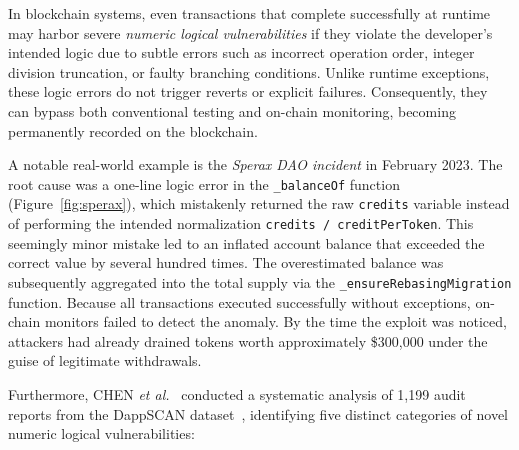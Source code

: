 \documentclass[pdflatex,sn-basic]{sn-jnl}%
\theoremstyle{thmstyleone}%
\theoremstyle{thmstyletwo}%
\theoremstyle{thmstylethree}%
\begin{document}
In blockchain systems, even transactions that complete successfully at runtime may harbor severe \textit{numeric logical vulnerabilities} if they violate the developer’s intended logic due to subtle errors such as incorrect operation order, integer division truncation, or faulty branching conditions. Unlike runtime exceptions, these logic errors do not trigger reverts or explicit failures. Consequently, they can bypass both conventional testing and on-chain monitoring, becoming permanently recorded on the blockchain.

A notable real-world example is the \textit{Sperax DAO incident} in February 2023. The root cause was a one-line logic error in the \texttt{\_balanceOf} function (Figure~\ref{fig:sperax}), which mistakenly returned the raw \texttt{credits} variable instead of performing the intended normalization \texttt{credits / creditPerToken}. This seemingly minor mistake led to an inflated account balance that exceeded the correct value by several hundred times. The overestimated balance was subsequently aggregated into the total supply via the \texttt{\_ensureRebasingMigration} function. Because all transactions executed successfully without exceptions, on-chain monitors failed to detect the anomaly. By the time the exploit was noticed, attackers had already drained tokens worth approximately \$300,000 under the guise of legitimate withdrawals.

Furthermore, CHEN \textit{et al.}~\citep{numscout} conducted a systematic analysis of 1,199 audit reports from the DappSCAN dataset~\citep{dappscan}, identifying five distinct categories of novel numeric logical vulnerabilities:
\end{document}
